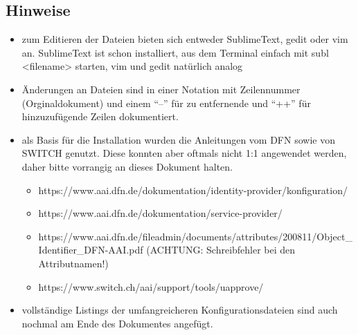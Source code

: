 \subsection{Hinweise}
\begin{itemize}
  \item zum Editieren der Dateien bieten sich entweder SublimeText, gedit oder
  vim an.
  SublimeText ist schon installiert, aus dem Terminal einfach mit subl
  <filename> starten, vim und gedit natürlich analog
  \item Änderungen an Dateien sind in einer Notation mit Zeilennummer
  (Orginaldokument) und einem "`--"' für zu entfernende und "`++"' für
  hinzuzufügende Zeilen dokumentiert.
  \item als Basis für die Installation wurden die Anleitungen vom DFN sowie von
  SWITCH genutzt. Diese konnten aber oftmals nicht 1:1 angewendet werden, daher
  bitte vorrangig an dieses Dokument halten.
  \begin{itemize}
    \item https://www.aai.dfn.de/dokumentation/identity-provider/konfiguration/
    \item https://www.aai.dfn.de/dokumentation/service-provider/
    \item
    https://www.aai.dfn.de/fileadmin/documents/attributes/200811/Object\_Identifier\_DFN-AAI.pdf
    (ACHTUNG: Schreibfehler bei den Attributnamen!)
    \item https://www.switch.ch/aai/support/tools/uapprove/
  \end{itemize}
  \item vollständige Listings der umfangreicheren Konfigurationsdateien sind
  auch nochmal am Ende des Dokumentes angefügt.
\end{itemize}
